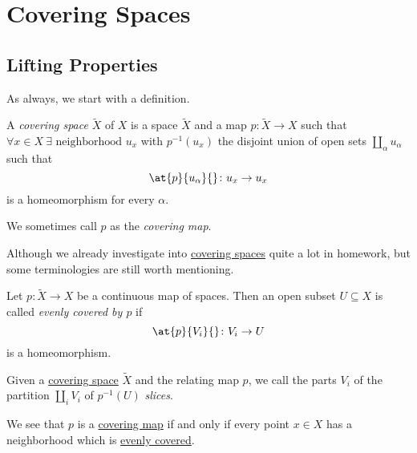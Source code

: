 \chapter{Covering Spaces}
\section{Lifting Properties}
As always, we start with a definition.
\begin{definition}\label{def:covering-space}
	A \emph{covering space} \(\widetilde{X} \) of \(X\) is a space \(\widetilde{X} \) and a map \(p\colon \widetilde{X} \to X\)
	such that \(\forall x\in X\ \exists \text{ neighborhood } u_{x}\) with \(p^{-1} (u_{x})\) the disjoint union of open sets
	\(\coprod_\alpha u_\alpha\) such that
	\[
		\at{p}{u_\alpha }{} \colon u_{x}\to u_{x}
	\]
	is a homeomorphism for every \(\alpha \).
	\begin{figure}[H]
		\centering
		\label{fig:def:covering-space}
	\end{figure}

	\begin{definition}\label{def:covering-map}
		We sometimes call \(p\) as the \emph{covering map}.
	\end{definition}
\end{definition}

Although we already investigate into \hyperref[def:covering-space]{covering spaces} quite a lot in homework, but some terminologies are still
worth mentioning.
\begin{definition}\label{def:evenly-covered}
	Let \(p\colon \widetilde{X} \to X\) be a continuous map of spaces. Then an open subset \(U\subseteq X\) is called \emph{evenly covered by \(p\) }
	if
	\[
		\at{p}{V_{i}}{} \colon V_{i}\to U
	\]
	is a homeomorphism.
\end{definition}
\begin{definition}[Slice]\label{def:slice}
	Given a \hyperref[def:covering-space]{covering space} \(\widetilde{X} \) and the relating map \(p\), we call the parts \(V_{i}\) of the
	partition \(\coprod_i V_{i}\) of \(p^{-1} (U)\) \emph{slices}.
\end{definition}
\begin{remark}
	We see that \(p\) is a \hyperref[def:covering-map]{covering map} if and only if every point \(x\in X\) has a neighborhood which is
	\hyperref[def:evenly-covered]{evenly covered}.
\end{remark}

